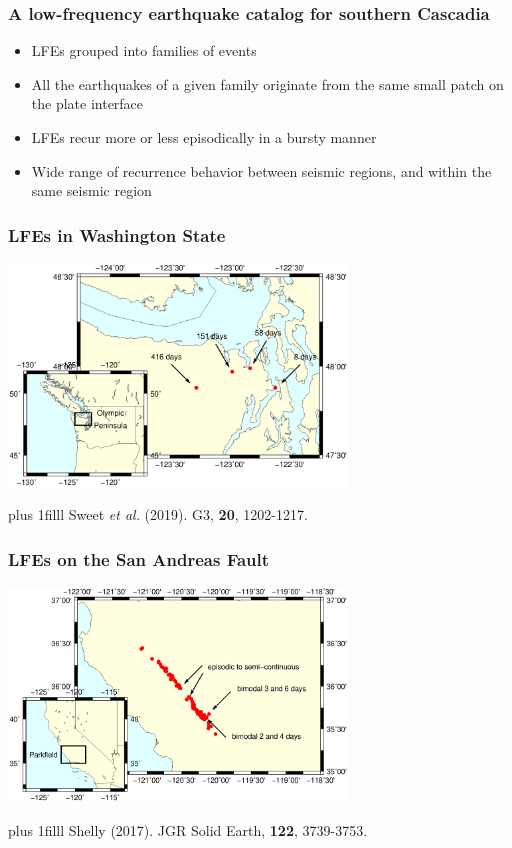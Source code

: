 \documentclass{beamer}
\newcommand{\btVFill}{\vskip0pt plus 1filll}
\begin{document}
	\begin{frame}
		\frametitle{A low-frequency earthquake catalog for southern Cascadia}
		\begin{itemize}
			\item LFEs grouped into families of events
			\item All the earthquakes of a given family originate from the same small patch on the plate interface
			\item LFEs recur more or less episodically in a bursty manner
			\item Wide range of recurrence behavior between seismic regions, and within the same seismic region
		\end{itemize}
	\end{frame}

	\begin{frame}
		\frametitle{LFEs in Washington State}
		\begin{center}
			\includegraphics[trim={1cm 3cm 1cm 14cm}, clip, width=9cm]{LFE_catalogs/cascadia.eps}
		\end{center}
		\btVFill
		\tiny{Sweet \textit{et al.} (2019). G3, \textbf{20}, 1202-1217.}
	\end{frame}

	\begin{frame}
		\frametitle{LFEs on the San Andreas Fault}
		\begin{center}
			\includegraphics[trim={1cm 3cm 1cm 14cm}, clip, width=9cm]{LFE_catalogs/sanandreas.eps}
		\end{center}
		\btVFill
		\tiny{Shelly (2017). JGR Solid Earth, \textbf{122}, 3739-3753.}
	\end{frame}
	
\end{document}
